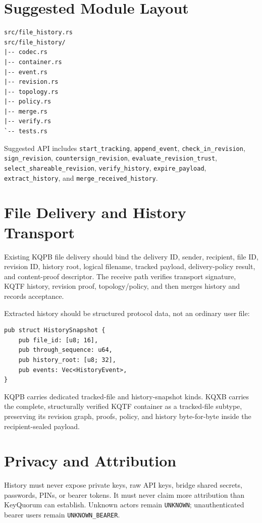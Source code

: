 \documentclass[11pt]{article}
\begin{document}
\section{Suggested Module Layout}
\begin{lstlisting}
src/file_history.rs
src/file_history/
|-- codec.rs
|-- container.rs
|-- event.rs
|-- revision.rs
|-- topology.rs
|-- policy.rs
|-- merge.rs
|-- verify.rs
`-- tests.rs
\end{lstlisting}

Suggested API includes \texttt{start\_tracking}, \texttt{append\_event}, \texttt{check\_in\_revision}, \texttt{sign\_revision}, \texttt{countersign\_revision}, \texttt{evaluate\_revision\_trust}, \texttt{select\_shareable\_revision}, \texttt{verify\_history}, \texttt{expire\_payload}, \texttt{extract\_history}, and \texttt{merge\_received\_history}.

\section{File Delivery and History Transport}
Existing KQPB file delivery should bind the delivery ID, sender, recipient, file ID, revision ID, history root, logical filename, tracked payload, delivery-policy result, and content-proof descriptor. The receive path verifies transport signature, KQTF history, revision proof, topology/policy, and then merges history and records acceptance.

Extracted history should be structured protocol data, not an ordinary user file:
\begin{lstlisting}
pub struct HistorySnapshot {
    pub file_id: [u8; 16],
    pub through_sequence: u64,
    pub history_root: [u8; 32],
    pub events: Vec<HistoryEvent>,
}
\end{lstlisting}
KQPB carries dedicated tracked-file and history-snapshot kinds. KQXB carries
the complete, structurally verified KQTF container as a tracked-file subtype, preserving
its revision graph, proofs, policy, and history byte-for-byte inside the
recipient-sealed payload.

\section{Privacy and Attribution}
History must never expose private keys, raw API keys, bridge shared secrets, passwords, PINs, or bearer tokens. It must never claim more attribution than KeyQuorum can establish. Unknown actors remain \texttt{UNKNOWN}; unauthenticated bearer users remain \texttt{UNKNOWN\_BEARER}.
\end{document}
